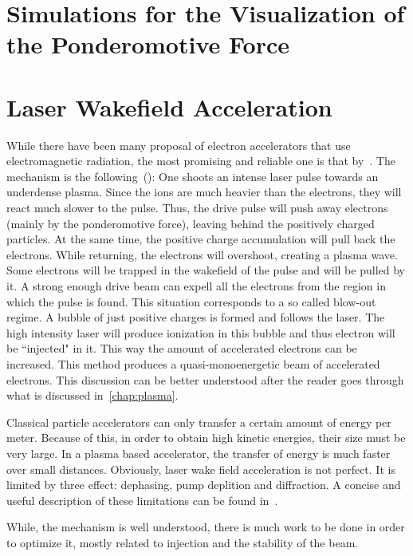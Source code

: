 \documentclass[12pt, class=report, crop=false]{standalone}
\begin{document}
\section{Simulations for the Visualization of the Ponderomotive Force}
\label{sec:ponderomotive-graphs}


\section{Laser Wakefield Acceleration}

While there have been many proposal of electron accelerators that use electromagnetic radiation, the most promising and reliable one is that by~\cite{tajimaLaserElectronAccelerator1979}. The mechanism is the following~(\cite{manglesIntroductionPlasmaWakefield}): One shoots an intense laser pulse towards an underdense plasma. Since the ions are much heavier than the electrons, they will react much slower to the pulse. Thus, the drive pulse will push away electrons (mainly by the ponderomotive force), leaving behind the positively charged particles. At the same time, the positive charge accumulation will pull back the electrons. While returning, the electrons will overshoot, creating a plasma wave. Some electrons will be trapped in the wakefield of the pulse and will be pulled by it. A strong enough drive beam can expell all the electrons from the region in which the pulse is found. This situation corresponds to a so called blow-out regime. A bubble of just positive charges is formed and follows the laser. The high intensity laser will produce ionization in this bubble and thus electron will be ``injected" in it. This way the amount of accelerated electrons can be increased. This method produces a quasi-monoenergetic beam of accelerated electrons. This discussion can be better understood after the reader goes through what is discussed in~\cref{chap:plasma}.

Classical particle accelerators can only transfer a certain amount of energy per meter. Because of this, in order to obtain high kinetic energies, their size must be very large. In a plasma based accelerator, the transfer of energy is much faster over small distances. Obviously, laser wake field acceleration is not perfect. It is limited by three effect: dephasing, pump deplition and diffraction. A concise and useful description of these limitations can be found in~\cite{oneilLaserWakefieldAcceleratior2017}.

While, the mechanism is well understood, there is much work to be done in order to optimize it, mostly related to injection and the stability of the beam.
\end{document}
